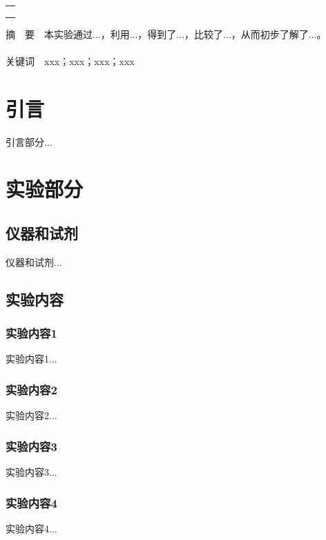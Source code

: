 \documentclass[12pt]{article}
\begin{document}
\begin{titlepage}
\begin{center}
            \begin{tabular*}{\textwidth}{c}
                \\ %
                \\ %
                \\ %
                \\ %
                \hline %
            \end{tabular*}
        \end{center}
        \textsf{摘\ \ 要}\ \ 本实验通过...，利用...，得到了...，比较了...，从而初步了解了...。
        \\
        \\
        \textsf{关键词}\ \ xxx；xxx；xxx；xxx
    \end{titlepage}

    \section{引言}
	引言部分...
               
	\vbox{} %
	     
    \section{实验部分}
    	\subsection{仪器和试剂}
    		仪器和试剂...
    			
    	 \subsection{实验内容}
			\subsubsection{实验内容1}
				实验内容1...
			\subsubsection{实验内容2}
				实验内容2...
			\subsubsection{实验内容3}
				实验内容3...
			\subsubsection{实验内容4}
				实验内容4...
\end{document}
